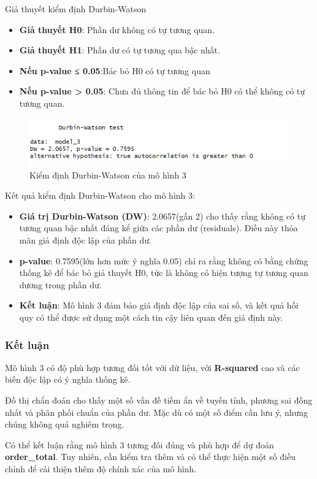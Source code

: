 Giả thuyết kiểm định Durbin-Watson
\begin{itemize}
  \item\textbf{Giả thuyết H0}: Phần  dư không có tự tương quan.
  \item\textbf{Giả thuyết H1}: Phần dư có tự tương qua bậc nhất.
  \item\textbf{Nếu p-value ≤ 0.05}:Bác bỏ H0 \rightarrow có tự tương quan
  \item\textbf{Nếu p-value > 0.05}: Chưa đủ thông tin để bác bỏ H0 \rightarrow có thể không có tự tương quan.
\end{itemize}

\begin{figure}[H]
  \centering
  \includegraphics[width=0.7\linewidth]{graphics/5.5.8.png}
  \caption{Kiểm định Durbin-Watson của mô hình 3 }
\end{figure}

Kết quả kiểm định Durbin-Watson cho mô hình 3:
\begin{itemize}
  \item\textbf{Giá trị Durbin-Watson (DW)}: 2.0657(gần 2) cho thấy rằng không có tự tương quan bậc nhất đáng kể giữa các phần dư (residuals). Điều này thỏa mãn giả định độc lập của phần dư.
  \item \textbf{p-value}: 0.7595(lớn hơn mức ý nghĩa 0.05) chỉ ra rằng không có bằng chứng thống kê để bác bỏ giả thuyết H0, tức là không có hiện tượng tự tương quan dương trong phần dư.
  \item\textbf{Kết luận}:  Mô hình 3 đảm bảo giả định độc lập của sai số, và kết quả hồi quy có thể được sử dụng một cách tin cậy liên quan đến giả định này.
\end{itemize}

\subsubsection{Kết luận}

Mô hình 3 có độ phù hợp tương đối tốt với dữ liệu, với \textbf{R-squared} cao và các biến độc lập có ý nghĩa thống kê.

Đồ thị chẩn đoán cho thấy một số vấn đề tiềm ẩn về tuyến tính, phương sai đồng nhất và phân phối chuẩn của phần dư. Mặc dù có một số điểm cần lưu ý, nhưng chúng không quá nghiêm trọng.

Có thể kết luận rằng mô hình 3 tương đối đúng và phù hợp để dự đoán \textbf{order\_total}. Tuy nhiên, cần kiểm tra thêm và có thể thực hiện một số điều chỉnh để cải thiện thêm độ chính xác của mô hình.







